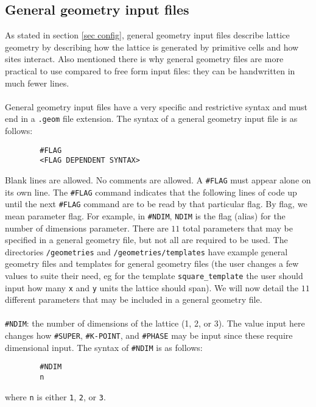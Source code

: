 \documentclass[12pt]{article}
\begin{document}
        \subsection{General geometry input files}
        As stated in section \ref{sec config}, general geometry input files describe lattice geometry by describing how the lattice is generated by primitive cells and how sites interact.
        Also mentioned there is why general geometry files are more practical to use compared to free form input files: they can be handwritten in much fewer lines. \\
        \\
        General geometry input files have a very specific and restrictive syntax and must end in a \texttt{.geom} file extension.
        The syntax of a general geometry input file is as follows:
        \begin{verbatim}
        #FLAG
        <FLAG DEPENDENT SYNTAX>
        \end{verbatim}
        Blank lines are allowed.
        No comments are allowed.
        A \texttt{\#FLAG} must appear alone on its own line.
        The \texttt{\#FLAG} command indicates that the following lines of code up until the next \texttt{\#FLAG} command are to be read by that particular flag.
        By flag, we mean parameter flag.
        For example, in \texttt{\#NDIM}, \texttt{NDIM} is the flag (alias) for the number of dimensions parameter.
        There are $11$ total parameters that may be specified in a general geometry file, but not all are required to be used.
        The directories \texttt{/geometries} and \texttt{/geometries/templates} have example general geometry files and templates for general geometry files (the user changes a few values to suite their need, eg for the template \texttt{square\_template} the user should input how many \texttt{x} and \texttt{y} units the lattice should span).
        We will now detail the $11$ different parameters that may be included in a general geometry file. \\
        \\
        \texttt{\#NDIM}: the number of dimensions of the lattice (1, 2, or 3).
        The value input here changes how \texttt{\#SUPER}, \texttt{\#K-POINT}, and \texttt{\#PHASE} may be input since these require dimensional input.
        The syntax of \texttt{\#NDIM} is as follows:
        \begin{verbatim}
        #NDIM
        n
        \end{verbatim}
        where \texttt{n} is either \texttt{1}, \texttt{2}, or \texttt{3}. \\
\end{document}
